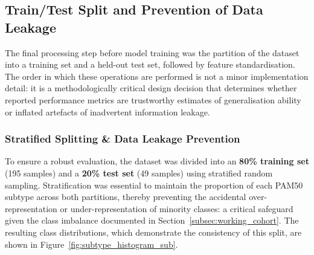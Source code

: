 \subsection{Train/Test Split and Prevention of Data Leakage}
\label{subsec:split}

The final processing step before model training was the partition of the
dataset into a training set and a held-out test set, followed by feature
standardisation. The order in which these operations are performed is not a
minor implementation detail: it is a methodologically critical design decision
that determines whether reported performance metrics are trustworthy estimates
of generalisation ability or inflated artefacts of inadvertent information
leakage.

\subsubsection*{Stratified Splitting \& Data Leakage Prevention}

To ensure a robust evaluation, the dataset was divided into an \textbf{80\% training set} 
(195 samples) and a \textbf{20\% test set} (49 samples) using stratified random 
sampling. Stratification was essential to maintain the proportion of each PAM50 
subtype across both partitions, thereby preventing the accidental over-representation 
or under-representation of minority classes: a critical safeguard given the class 
imbalance documented in Section~\ref{subsec:working_cohort}. The resulting class 
distributions, which demonstrate the consistency of this split, are shown in 
Figure~\ref{fig:subtype_histogram_sub}.

